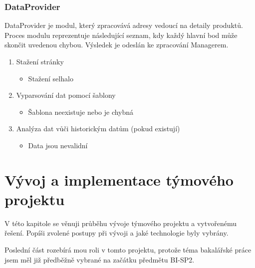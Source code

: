\documentclass[thesis=B,czech]{FITthesis}[2012/06/26]
\begin{document}
\subsection{DataProvider}
DataProvider je modul, který zpracovává adresy vedoucí na detaily produktů. Proces modulu reprezentuje následující seznam, kdy každý hlavní bod může skončit uvedenou chybou. Výsledek je odeslán ke zpracování Managerem.
\par
\begin{enumerate}
\item Stažení stránky
	\begin{itemize}
	\item Stažení selhalo
	\end{itemize}
\item Vyparsování dat pomocí šablony
	\begin{itemize}
	\item Šablona neexistuje nebo je chybná
	\end{itemize}
\item Analýza dat vůči historickým datům (pokud existují)
	\begin{itemize}
	\item Data jsou nevalidní
	\end{itemize}
\end{enumerate}



\chapter{Vývoj a implementace týmového projektu}
V této kapitole se věnuji průběhu vývoje týmového projektu a vytvořenému řešení. Popíši zvolené postupy při vývoji a 
jaké technologie byly vybrány.
\par
Poslední část rozebírá mou roli v tomto
projektu, protože téma bakalářské práce jsem měl již předběžně vybrané na začátku předmětu BI-SP2.
\end{document}

